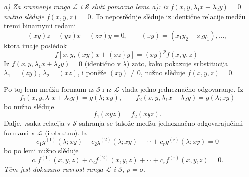 \documentclass[11pt]{article}
\begin{document}
{\itshape a) Za sravnenje ranga $\mathcal L$ i $\mathcal S$ služi pomocna lema a): iz $f(x,y,\lambda_1x+\lambda_2y)=0$ nužno slěduje $f(x,y,z)=0$.} To neposrědnje slěduje iz identične relacije medžu tremi binarnymi redami
\[
  (xy)z+(yz)x+(zx)y=0,
  \qquad (xy)=(x_1y_2-x_2y_1),\ldots,
\]
ktora imaje poslědok
\[
  f[x,y,(xy)x+(xz)y]=(xy)^p f(x,y,z).
\]
Iz $f(x,y,\lambda_1x+\lambda_2y)=0$ (identično v $\lambda$) zato, kako pokazuje substitucija $\lambda_1=(zy)$, $\lambda_2=(xz)$, i poněže $(xy)\ne0$, nužno slěduje $f(x,y,z)=0$.

Po toj lemi medžu formami iz $\mathcal S$ i iz $\mathcal L$ vlada jedno-jednoznačno odgovaranje. Iz
\[
  f_1(x,y,\lambda_1x+\lambda_2y)=g(\lambda;xy),\qquad
  f_2(x,y,\lambda_1x+\lambda_2y)=g(\lambda;xy)
\]
bo nužno slěduje
\[
  f_1(xyz)=f_2(xyz).
\]
Dalje, vsaka relacija v $\mathcal S$ sahranja se takože medžu jednoznačno odgovarajučimi formami v $\mathcal L$ (i obratno). Iz
\[
  c_1g^{(1)}(\lambda;xy)+c_2g^{(2)}(\lambda;xy)+\cdots+c_rg^{(r)}(\lambda;xy)=0
\]
bo po lemi nužno slěduje
\[
  c_1f^{(1)}(x,y,z)+c_2f^{(2)}(x,y,z)+\cdots+c_rf^{(r)}(x,y,z)=0.
\]
{\itshape Těm jest dokazano ravnost ranga $\mathcal L$ i $\mathcal S$; $\rho=\sigma$.}
\end{document}
